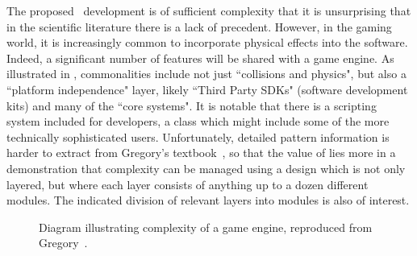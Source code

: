 The proposed \nep\ development is of sufficient complexity that it is unsurprising that 
in the scientific literature there is a lack of precedent. However, in the gaming world,
it is increasingly common to incorporate physical effects into the software. Indeed,
a significant number of features will be shared with a game engine. 
As illustrated in , commonalities include not just ``collisions and
physics", but also a ``platform independence" layer, likely
``Third Party SDKs" (software development kits) and many of the ``core systems". It is notable that
there is a scripting system included for developers, a class  which might include some of the
more technically sophisticated users. Unfortunately, detailed pattern information
is harder to extract from Gregory's textbook~\cite{gregory2},
so that the value of  lies more in a demonstration
that complexity can be managed using a design which is not only layered, but where
each layer consists of anything up to a dozen different modules. The indicated division of 
relevant layers into modules is also of interest.

\begin{figure}
\centerline{}
\caption{\label{fig:gamestruct}
Diagram illustrating complexity of a game engine, reproduced from Gregory~\protect\cite[\S\,1.6]{gregory2}.}
\end{figure}
